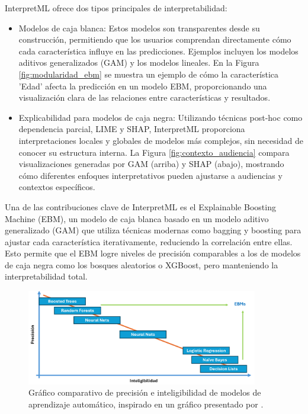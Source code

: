 InterpretML ofrece dos tipos principales de interpretabilidad:
\begin{itemize}
    \item Modelos de caja blanca: Estos modelos son transparentes desde su construcción, permitiendo que los usuarios comprendan directamente cómo cada característica influye en las predicciones. Ejemplos incluyen los modelos aditivos generalizados (GAM) y los modelos lineales. En la Figura \ref{fig:modularidad_ebm} se muestra un ejemplo de cómo la característica 'Edad' afecta la predicción en un modelo EBM, proporcionando una visualización clara de las relaciones entre características y resultados.
    \item Explicabilidad para modelos de caja negra: Utilizando técnicas post-hoc como dependencia parcial, LIME y SHAP, InterpretML proporciona interpretaciones locales y globales de modelos más complejos, sin necesidad de conocer su estructura interna. La Figura \ref{fig:contexto_audiencia} compara visualizaciones generadas por GAM (arriba) y SHAP (abajo), mostrando cómo diferentes enfoques interpretativos pueden ajustarse a audiencias y contextos específicos.
\end{itemize}

Una de las contribuciones clave de InterpretML es el Explainable Boosting Machine (EBM), un modelo de caja blanca basado en un modelo aditivo generalizado (GAM) que utiliza técnicas modernas como bagging y boosting para ajustar cada característica iterativamente, reduciendo la correlación entre ellas. Esto permite que el EBM logre niveles de precisión comparables a los de modelos de caja negra como los bosques aleatorios o XGBoost, pero manteniendo la interpretabilidad total.

\begin{figure}[H]
    \centering
    \includegraphics[width=0.9\textwidth]{include/EBMs.png}
    \caption{Gráfico comparativo de precisión e inteligibilidad de modelos de aprendizaje automático, inspirado en un gráfico presentado por \cite{microsoftEBMvideo}.}
    \label{fig:EBMs}
\end{figure}

